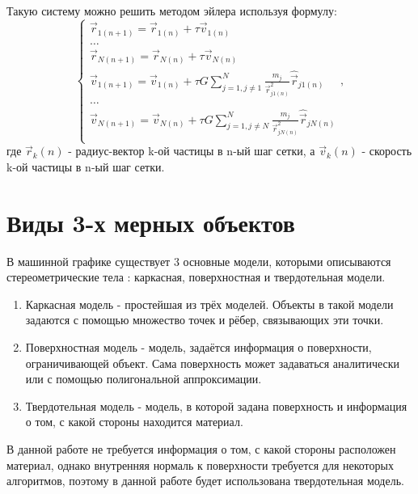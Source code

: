 Такую систему можно решить методом эйлера используя формулу:
\begin{equation}
	\label{n_euler_velocities}
	\begin{cases}
		\vec{r}_{1(n+1)} = \vec{r}_{1(n)} + \tau \vec{v}_{1(n)} \\
		\dots \\
		\vec{r}_{N(n+1)} = \vec{r}_{N(n)} + \tau \vec{v}_{N(n)} \\
		
		
		\vec{v}_{1(n+1)} = \vec{v}_{1(n)} + \tau G\sum_{j=1, j \neq 1}^{N}{\frac{m_j}{\vec{r}_{j1(n)}^2}\hat{\vec{r}}_{j1(n)}} \\
		\dots \\
		\vec{v}_{N(n+1)} = \vec{v}_{N(n)} + \tau G\sum_{j=1, j \neq N}^{N}{\frac{m_j}{\vec{r}_{jN(n)}^2}\hat{\vec{r}}_{jN(n)}} \\
	\end{cases},
\end{equation}
где $\vec{r}_k(n)$ - радиус-вектор k-ой частицы в n-ый шаг сетки, а $\vec{v}_k(n)$ - скорость k-ой частицы в n-ый шаг сетки.

\section{Виды 3-х мерных объектов}
В машинной графике существует 3 основные модели, которыми описываются стереометрические тела \cite{rodgers}: каркасная, поверхностная и твердотельная модели.

\begin{enumerate}
	\item Каркасная модель - простейшая из трёх моделей. Объекты в такой модели задаются с помощью множество точек и рёбер, связывающих эти точки.
	\item Поверхностная модель - модель, задаётся информация о поверхности, ограничивающей объект. Сама поверхность может задаваться аналитически или с помощью полигональной аппроксимации.
	\item Твердотельная модель - модель, в которой задана поверхность и информация о том, с какой стороны находится материал.
\end{enumerate}

В данной работе не требуется информация о том, с какой стороны расположен материал, однако внутренняя нормаль к поверхности требуется для некоторых алгоритмов, поэтому в данной работе будет использована твердотельная модель.

